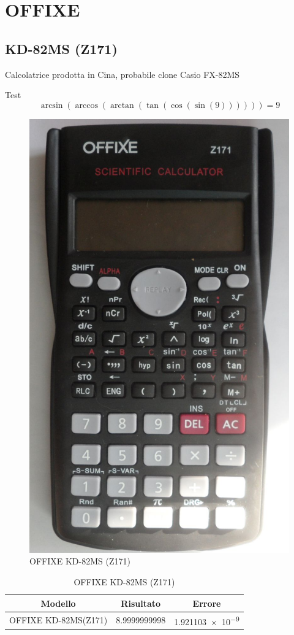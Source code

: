 \chapter{OFFIXE}
\section{KD-82MS (Z171)}
Calcolatrice prodotta in Cina, probabile clone Casio FX-82MS

Test	\[\arcsin(\arccos(\arctan(\tan(\cos(\sin(9))))))=9\]
\begin{figure}
\centering
\includegraphics[width=0.3\linewidth]{offixe/SAM_3719}
\caption{OFFIXE KD-82MS (Z171)}
\label{fig:sam3719}
\end{figure}
\begin{table}
	\centering
		\begin{tabular}{lll}
		\toprule
		\multicolumn{1}{c}{Modello}&\multicolumn{1}{c}{Risultato}&\multicolumn{1}{c}{Errore}\\
		\midrule
		OFFIXE KD-82MS(Z171)&\num{8.9999999998}&\num{1.921103e-9}\\
		\bottomrule
	\end{tabular} 
	\caption{OFFIXE KD-82MS (Z171)}
	\label{tab:OFFIXEKD82MS}
\end{table}
